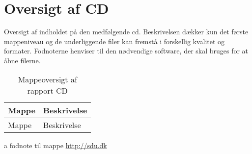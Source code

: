 \newpage
\section{Oversigt af CD}\label{bilag:cd}
Oversigt af indholdet på den medfølgende cd. Beskrivelsen dækker kun det første mappeniveau og de underliggende filer kan fremstå i forskellig kvalitet og formater. Fodnoterne henviser til den nødvendige software, der skal bruges for at åbne filerne.

\begin{table}[h!]
\centering
\caption{Mappeoversigt af rapport CD}
\label{tab:ordliste}
\begin{threeparttable}
\begin{tabular}{l l}
\toprule
\multicolumn{1}{l}{Mappe}       &
\multicolumn{1}{l}{Beskrivelse}  \\ 
\midrule
Mappe					& Beskrivelse \\
\bottomrule
\end{tabular}
\begin{tablenotes}
\item[a] fodnote til mappe  \url{http://sdu.dk}
\end{tablenotes}
\end{threeparttable}
\end{table}


